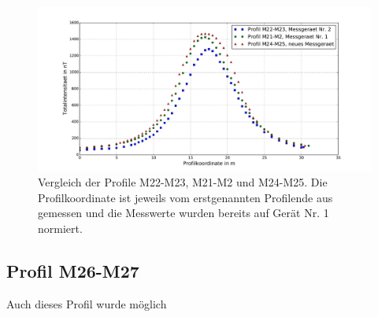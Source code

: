 \begin{figure}
 \centering
 \includegraphics[width=\textwidth]{fig/Vergleich_nahe_Profile.pdf}
 \caption[Vergleich der Profile M22-M23, M21-M2 und M24-M25]{Vergleich der Profile M22-M23, M21-M2 und M24-M25. Die Profilkoordinate ist jeweils vom erstgenannten Profilende aus gemessen und die Messwerte wurden bereits auf Gerät Nr. 1 normiert.}
 \label{fig:Vergleich_Profile}
\end{figure}

\subsection{Profil M26-M27}

Auch dieses Profil wurde möglich

